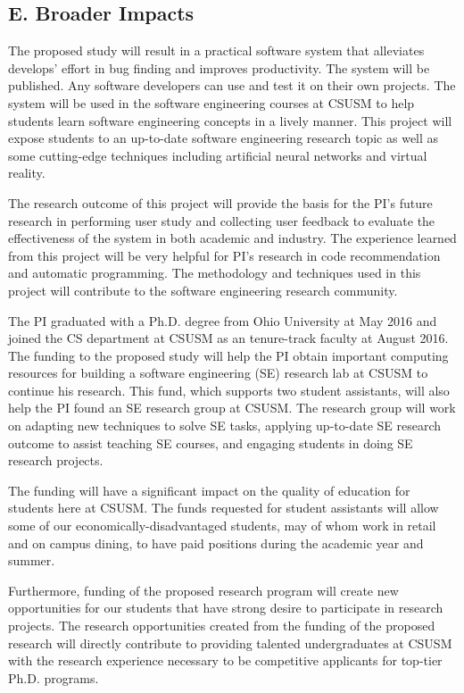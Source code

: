 \subsection{E. Broader Impacts}
The proposed study will result in a practical software system that alleviates develops' effort in bug finding and improves productivity. The system will be published. Any software developers can use and test it on their own projects. The system will be used in the software engineering courses at CSUSM to help students learn software engineering concepts in a lively manner. This project will expose students to an up-to-date software engineering research topic as well as some cutting-edge techniques including artificial neural networks and virtual reality.

The research outcome of this project will provide the basis for the PI's future research in performing user study and collecting user feedback to evaluate the effectiveness of the system in both academic and industry. The experience learned from this project will be very helpful for PI's research in code recommendation and automatic programming. The methodology and techniques used in this project will contribute to the software engineering research community.

The PI graduated with a Ph.D. degree from Ohio University at May 2016 and joined the CS department at CSUSM as an tenure-track faculty at August 2016. The funding to the proposed study will help the PI obtain important computing resources for building a software engineering (SE) research lab at CSUSM to continue his research. This fund, which supports two student assistants, will also help the PI found an SE research group at CSUSM. The research group will work on adapting new techniques to solve SE tasks, applying up-to-date SE research outcome to assist teaching SE courses, and engaging students in doing SE research projects.

The funding will have a significant impact on the quality of education for students here at CSUSM. The funds requested for student assistants will allow some of our economically-disadvantaged students, may of whom work in retail and on campus dining, to have paid positions during the academic year and summer.

Furthermore, funding of the proposed research program will create new opportunities for our students that have strong desire to participate in research projects. The research opportunities created from the funding of the proposed research will directly contribute to providing talented undergraduates at CSUSM with the research experience necessary to be competitive applicants for top-tier Ph.D. programs.

